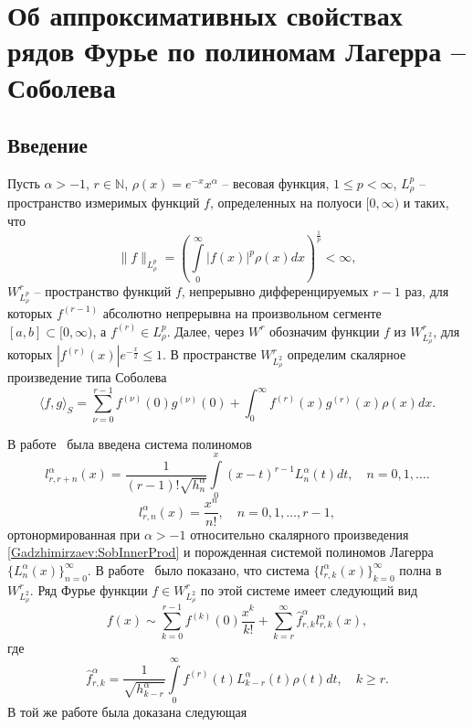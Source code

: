 
\chapter{Об аппроксимативных свойствах рядов Фурье по полиномам Лагерра -- Соболева}

\section*{Введение}

Пусть $\alpha>-1$, $r\in \mathbb{N}$, $\rho(x)=e^{-x}x^\alpha$ -- весовая функция, $1\le p<\infty$, $L^p_\rho$ -- пространство измеримых функций $f$, определенных на полуоси $[0, \infty)$ и таких, что
$$
\|f\|_{L^p_\rho}=\left(\int\limits_0^{\infty}|f(x)|^p\rho(x) dx\right)^\frac{1}{p}<\infty,
$$
$W^r_{L^p_\rho}$ -- пространство функций $f$, непрерывно дифференцируемых $r-1$ раз, для которых $f^{(r-1)}$ абсолютно непрерывна на произвольном сегменте $[a, b]\subset[0, \infty)$, а $f^{(r)}\in L^p_\rho$.
Далее, через $W^r$ обозначим функции $f$ из $W^r_{L^2_\rho}$, для которых $|f^{(r)}(x)|e^{-\frac x2}\le 1$. В пространстве $W^r_{L^2_\rho}$ определим скалярное произведение типа Соболева
\begin{equation}\label{Gadzhimirzaev:SobInnerProd}
\langle f,g\rangle_S=\sum_{\nu=0}^{r-1}f^{(\nu)}(0)g^{(\nu)}(0)+\int_{0}^{\infty} f^{(r)}(x)g^{(r)}(x)\rho(x)dx.
\end{equation}

В работе~\cite{Gadzhimirzaev:DEMR2016} была введена система полиномов
\begin{equation*}
l_{r,r+n}^{\alpha}(x) =\frac{1}{(r-1)!\sqrt{h_n^\alpha}}\int\limits_{0}^x(x-t)^{r-1}L_{n}^{\alpha}(t)dt, \quad n=0,1,\ldots.
\end{equation*}
\begin{equation*}
l_{r,n}^{\alpha}(x) =\frac{x^n}{n!}, \quad n=0,1,\ldots, r-1,
\end{equation*}
ортонормированная при $\alpha>-1$ относительно скалярного произведения \eqref{Gadzhimirzaev:SobInnerProd} и порожденная системой полиномов Лагерра $\{L_{n}^{\alpha}(x)\}_{n=0}^\infty$.
В работе~\cite{Gadzhimirzaev:ShII-MMG} было показано, что система $\{l^\alpha_{r,k}(x)\}_{k=0}^\infty$ полна в $W^r_{L^2_\rho}$. Ряд Фурье функции $f\in W^r_{L^2_\rho}$ по этой системе имеет следующий вид
\begin{equation}\label{Gadzhimirzaev:Fourier_Series}
f(x)\sim \sum_{k=0}^{r-1}f^{(k)}(0)\frac{x^k}{k!}+\sum_{k=r}^{\infty} \hat{f}_{r,k}^\alpha l_{r,k}^\alpha(x),
\end{equation}
где
\begin{equation*}
\hat{f}_{r,k}^\alpha=\frac{1}{\sqrt{h_{k-r}^\alpha}}\int\limits_0^\infty f^{(r)}(t)L_{k-r}^\alpha(t)\rho(t)dt, \quad k\ge r.
\end{equation*}
В той же работе была доказана следующая

